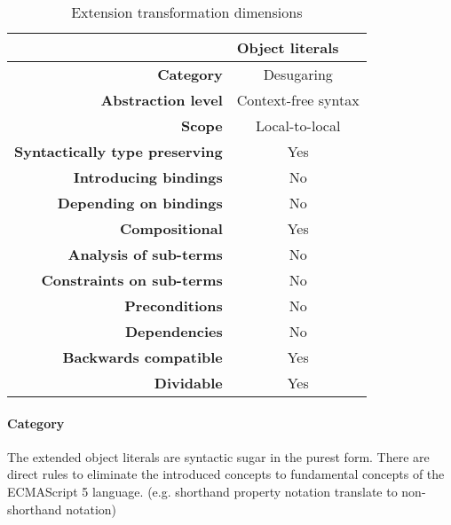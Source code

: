 \begin{table}[h]
\centering
\caption{Extension transformation dimensions}
\label{object-literals-table}
\begin{tabular}{@{}rc@{}}
\toprule
                                       & \multicolumn{1}{l}{\textbf{Object literals}} \\ \midrule
\textbf{Category}                      & Desugaring
\\
\textbf{Abstraction level}          & Context-free syntax                          \\
\textbf{Scope}                         & Local-to-local                               \\
\textbf{Syntactically type preserving} & Yes                                          \\
\textbf{Introducing bindings}          & No                                          \\%
\textbf{Depending on bindings}         & No                                           \\
\textbf{Compositional}                 & Yes                                          \\
\textbf{Analysis of sub-terms}          & No                                          \\
\textbf{Constraints on sub-terms}       & No                                           \\
\textbf{Preconditions}                 & No                                          \\
\textbf{Dependencies}                  & No                                           \\
\textbf{Backwards compatible}          & Yes                                          \\
\textbf{Dividable}                     & Yes                                           \\ \bottomrule
\end{tabular}
\end{table}

\paragraph{Category}
The extended object literals are syntactic sugar in the purest form. There are direct rules to eliminate the introduced concepts to fundamental concepts of the ECMAScript 5 language. (e.g. shorthand property notation translate to non-shorthand notation)


